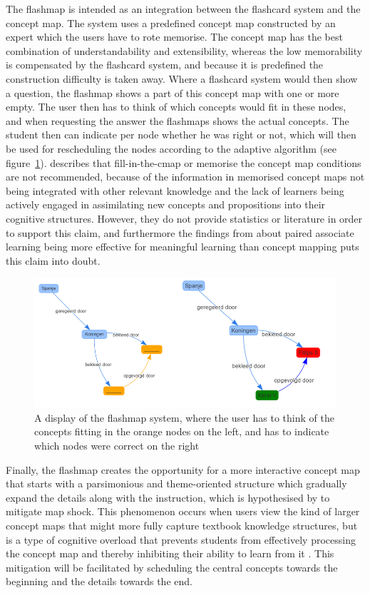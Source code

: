 \documentclass[11pt,twoside]{report} %
\begin{document}
The flashmap is intended as an integration between the flashcard system and the concept map. The system uses a predefined concept map constructed by an expert which the users have to rote memorise. The concept map has the best combination of understandability and extensibility, whereas the low memorability is compensated by the flashcard system, and because it is predefined the construction difficulty is taken away. Where a flashcard system would then show a question, the flashmap shows a part of this concept map with one or more empty. The user then has to think of which concepts would fit in these nodes, and when requesting the answer the flashmaps shows the actual concepts. The student then can indicate per node whether he was right or not, which will then be used for rescheduling the nodes according to the adaptive algorithm (see figure~\ref{fig:flashmap}).  describes that fill-in-the-cmap or memorise the concept map conditions are not recommended, because of the information in memorised concept maps not being integrated with other relevant knowledge and the lack of learners being actively engaged in assimilating new concepts and propositions into their cognitive structures. However, they do not provide statistics or literature in order to support this claim, and furthermore the findings from  about paired associate learning being more effective for meaningful learning than concept mapping puts this claim into doubt.

\begin{figure}
    \centering
    \includegraphics[width=\textwidth]{img/flashmap}
    \caption{A display of the flashmap system, where the user has to think of the concepts fitting in the orange nodes on the left, and has to indicate which nodes were correct on the right}
    \label{fig:flashmap}
\end{figure}

Finally, the flashmap creates the opportunity for a more interactive concept map that starts with a parsimonious and theme-oriented structure which gradually expand the details along with the instruction, which is hypothesised by  to mitigate map shock. This phenomenon occurs when users view the kind of larger concept maps that might more fully capture textbook knowledge structures, but is a type of cognitive overload that prevents students from effectively processing the concept map and thereby inhibiting their ability to learn from it \cite{moore}. This mitigation will be facilitated by scheduling the central concepts towards the beginning and the details towards the end.
\end{document}
